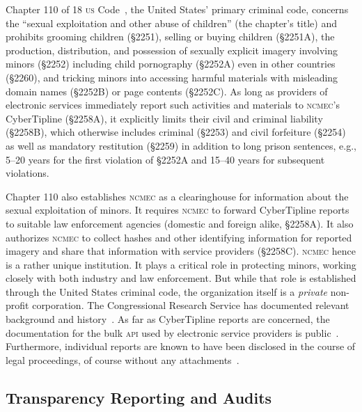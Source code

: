 \documentclass[nonacm,screen]{acmart}
\newcommand\V[1]{\textsc{\MakeLowercase{#1}}}
\begin{document}
Chapter 110 of 18 \V{US} Code~\cite{Chapter110Code18US}, the United States'
primary criminal code, concerns the ``sexual exploitation and other abuse of
children'' (the chapter's title) and prohibits grooming children (\S2251),
selling or buying children (\S2251A), the production, distribution, and
possession of sexually explicit imagery involving minors (\S2252) including
child pornography (\S2252A) even in other countries (\S2260), and tricking
minors into accessing harmful materials with misleading domain names (\S2252B)
or page contents (\S2252C). As long as providers of electronic services
immediately report such activities and materials to \V{NCMEC}'s CyberTipline
(\S2258A), it explicitly limits their civil and criminal liability (\S2258B),
which otherwise includes criminal (\S2253) and civil forfeiture (\S2254) as well
as mandatory restitution (\S2259) in addition to long prison sentences, e.g.,
5--20 years for the first violation of \S2252A and 15--40 years for subsequent
violations.

Chapter 110 also establishes \V{NCMEC} as a clearinghouse for information about
the sexual exploitation of minors. It requires \V{NCMEC} to forward CyberTipline
reports to suitable law enforcement agencies (domestic and foreign alike,
\S2258A). It also authorizes \V{NCMEC} to collect hashes and other identifying
information for reported imagery and share that information with service
providers (\S2258C). \V{NCMEC} hence is a rather unique institution. It plays a
critical role in protecting minors, working closely with both industry and law
enforcement. But while that role is established through the United States
criminal code, the organization itself is a \emph{private} non-profit
corporation. The Congressional Research Service has documented relevant
background and history~\cite{FernandesAlcantaraHanson2021}. As far as
CyberTipline reports are concerned, the documentation for the bulk \V{API} used
by electronic service providers is public~\cite{NCMEC2024}. Furthermore,
individual reports are known to have been disclosed in the course of legal
proceedings, of course without any
attachments~\cite{NationalCenterForMissingAndExploitedChildren2017,
NationalCenterForMissingAndExploitedChildren2017a}.


\subsection{Transparency Reporting and Audits}
\end{document}
